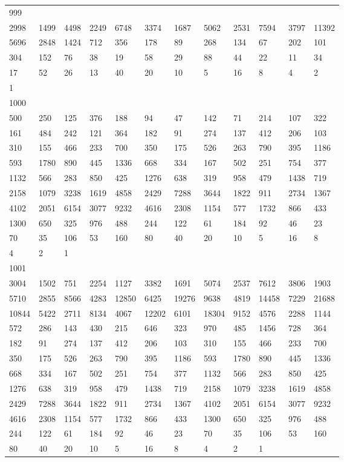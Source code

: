 \begin{longtable}{llllllllllll}
999&&&&&&&&&&&\\
2998& 1499& 4498& 2249& 6748& 3374& 1687& 5062& 2531& 7594& 3797& 11392\\
5696& 2848& 1424& 712& 356& 178& 89& 268& 134& 67& 202& 101\\
304& 152& 76& 38& 19& 58& 29& 88& 44& 22& 11& 34\\
17& 52& 26& 13& 40& 20& 10& 5& 16& 8& 4& 2\\
1& \\

1000&&&&&&&&&&&\\
500& 250& 125& 376& 188& 94& 47& 142& 71& 214& 107& 322\\
161& 484& 242& 121& 364& 182& 91& 274& 137& 412& 206& 103\\
310& 155& 466& 233& 700& 350& 175& 526& 263& 790& 395& 1186\\
593& 1780& 890& 445& 1336& 668& 334& 167& 502& 251& 754& 377\\
1132& 566& 283& 850& 425& 1276& 638& 319& 958& 479& 1438& 719\\
2158& 1079& 3238& 1619& 4858& 2429& 7288& 3644& 1822& 911& 2734& 1367\\
4102& 2051& 6154& 3077& 9232& 4616& 2308& 1154& 577& 1732& 866& 433\\
1300& 650& 325& 976& 488& 244& 122& 61& 184& 92& 46& 23\\
70& 35& 106& 53& 160& 80& 40& 20& 10& 5& 16& 8\\
4& 2& 1& \\

1001&&&&&&&&&&&\\
3004& 1502& 751& 2254& 1127& 3382& 1691& 5074& 2537& 7612& 3806& 1903\\
5710& 2855& 8566& 4283& 12850& 6425& 19276& 9638& 4819& 14458& 7229& 21688\\
10844& 5422& 2711& 8134& 4067& 12202& 6101& 18304& 9152& 4576& 2288& 1144\\
572& 286& 143& 430& 215& 646& 323& 970& 485& 1456& 728& 364\\
182& 91& 274& 137& 412& 206& 103& 310& 155& 466& 233& 700\\
350& 175& 526& 263& 790& 395& 1186& 593& 1780& 890& 445& 1336\\
668& 334& 167& 502& 251& 754& 377& 1132& 566& 283& 850& 425\\
1276& 638& 319& 958& 479& 1438& 719& 2158& 1079& 3238& 1619& 4858\\
2429& 7288& 3644& 1822& 911& 2734& 1367& 4102& 2051& 6154& 3077& 9232\\
4616& 2308& 1154& 577& 1732& 866& 433& 1300& 650& 325& 976& 488\\
244& 122& 61& 184& 92& 46& 23& 70& 35& 106& 53& 160\\
80& 40& 20& 10& 5& 16& 8& 4& 2& 1& \\


\end{longtable}
